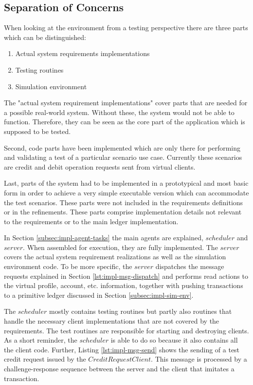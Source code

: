 \subsection{Separation of Concerns}

When looking at the environment from a testing perspective there are three parts which can be distinguished:

\begin{enumerate}
	\item Actual system requirements implementations
	\item Testing routines
	\item Simulation environment
\end{enumerate}

The "actual system requirement implementations" cover parts that are needed for a possible real-world system. Without these, the system would not be able to function. Therefore, they can be seen as the core part of the application which is supposed to be tested.

Second, code parts have been implemented which are only there for performing and validating a test of a particular scenario use case. Currently these scenarios are credit and debit operation requests sent from virtual clients.

Last, parts of the system had to be implemented in a prototypical and most basic form in order to achieve a very simple executable version which can accommodate the test scenarios. These parts were not included in the requirements definitions or in the refinements. These parts comprise implementation details not relevant to the requirements or to the main ledger implementation.

In Section \ref{subsec:impl-agent-tasks} the main agents are explained, $scheduler$ and $server$. When assembled for execution, they are fully implemented. The $server$ covers the actual system requirement realizations as well as the simulation environment code. To be more specific, the $server$ dispatches the message requests explained in Section \ref{lst:impl-msg-dispatch} and performs read actions to the virtual profile, account, etc. information, together with pushing transactions to a primitive ledger discussed in Section \ref{subsec:impl-sim-env}.

The $scheduler$ mostly contains testing routines but partly also routines that handle the necessary client implementations that are not covered by the requirements. The test routines are responsible for starting and destroying clients. As a short reminder, the $scheduler$ is able to do so because it also contains all the client code. Further, Listing \ref{lst:impl-msg-send} shows the sending of a test credit request issued by the $CreditRequestClient$. This message is processed by a challenge-response sequence between the server and the client that imitates a transaction.

